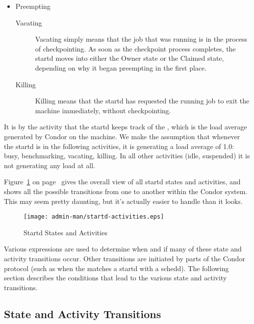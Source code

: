 \begin{itemize}
\begin{description}
\end{description}

\item Preempting
\begin{description}
  
\item[Vacating] Vacating simply means that the job that was running is
  in the process of checkpointing.  As soon as the checkpoint process
  completes, the startd moves into either the Owner state or the
  Claimed state, depending on why it began preempting in the first
  place.
  
\item[Killing] Killing means that the startd has requested the running
  job to exit the machine immediately, without checkpointing.

\end{description}

\end{itemize}

\Note It is by the activity that the startd keeps track of
the , which is the load average generated by
Condor on the machine.  We make the assumption that whenever the
startd is in the following activities, it is generating a load average
of 1.0: busy, benchmarking, vacating, killing.  In all other
activities (idle, suspended) it is not generating any load at all.

Figure~\ref{fig:startd-activities} on
page~\pageref{fig:startd-activities} gives the overall view of all
startd states and activities, and shows all the possible transitions
from one to another within the Condor system.  This may seem pretty
daunting, but it's actually easier to handle than it looks.

\begin{figure}[hbt]
\centering
\texttt{[image: admin-man/startd-activities.eps]}
\caption{\label{fig:startd-activities}Startd States and Activities}
\end{figure}

Various expressions are used to determine when and if many of these
state and activity transitions occur.  Other transitions are initiated
by parts of the Condor protocol (such as when the 
matches a startd with a schedd).  The following section describes the
conditions that lead to the various state and activity transitions.

\subsection{ State and Activity Transitions}
\label{sec:State-and-Activity-Transitions}

